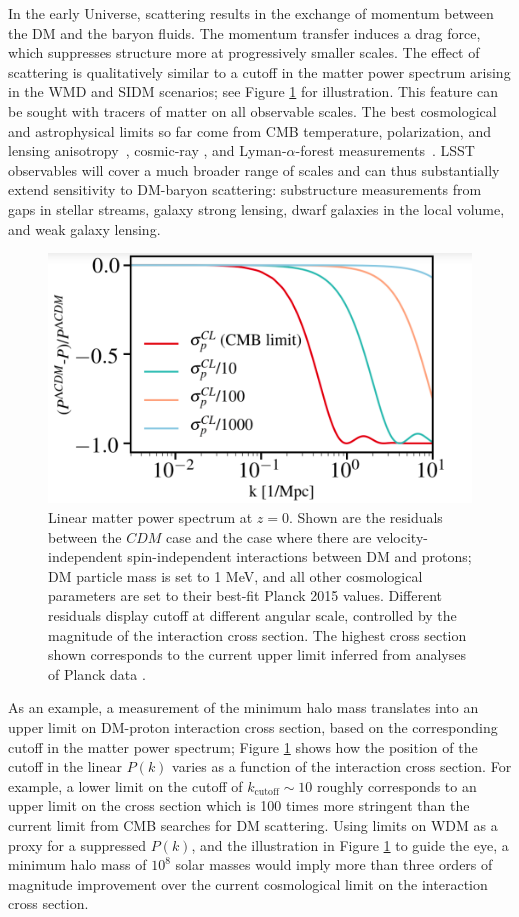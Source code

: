 In the early Universe, scattering results in the exchange of momentum between the DM and the baryon fluids.
The momentum transfer induces a drag force, which suppresses structure more at progressively smaller scales. 
The effect of scattering is qualitatively similar to a cutoff in the matter power spectrum arising in the WMD and SIDM scenarios; see Figure \ref{fig:dmbaryon_pk} for illustration.
This feature can be sought with tracers of matter on all observable scales. 
The best cosmological and astrophysical limits so far come from CMB temperature, polarization, and lensing anisotropy~\citep{Boddy:2018kfv,Gluscevic:2017ywp,Boddy:2018wzy,Xu:2018efh,Slatyer:2018aqg}, cosmic-ray \cite{}, and Lyman-$\alpha$-forest measurements~\citep{Dvorkin:2013cea,Xu:2018efh}. 
LSST observables will cover a much broader range of scales and can thus substantially extend sensitivity to DM-baryon scattering: substructure measurements from gaps in stellar streams, galaxy strong lensing, dwarf galaxies in the local volume, and weak galaxy lensing. 

\begin{figure}
\centering
\includegraphics[width=0.6\columnwidth]{figures/dmbaryon_pk.png}
\caption{Linear matter power spectrum at $z=0$. Shown are the residuals between the $CDM$ case and the case where there are velocity-independent spin-independent interactions between DM and protons; DM particle mass is set to 1 MeV, and all other cosmological parameters are set to their best-fit Planck 2015 values. Different residuals display cutoff at different angular scale, controlled by the magnitude of the interaction cross section. The highest cross section shown corresponds to the current upper limit inferred from analyses of Planck data \citep{Gluscevic:2017ywp,Boddy:2018kfv}.}
\label{fig:dmbaryon_pk}
\end{figure}
As an example, a measurement of the minimum halo mass translates into an upper limit on DM-proton interaction cross section, based on the corresponding cutoff in the  matter power spectrum; Figure \ref{fig:dmbaryon_pk} shows how the position of the cutoff in the linear $P(k)$ varies as a function of the interaction cross section. For example, a lower limit on the cutoff of $k_\text{cutoff}\sim 10$ roughly corresponds to an upper limit on the cross section which is 100 times more stringent than the current limit from CMB searches for DM scattering. Using limits on WDM as a proxy for a suppressed $P(k)$, and the illustration in Figure \ref{fig:dmbaryon_pk} to guide the eye, a minimum halo mass of $10^8$ solar masses would imply more than three orders of magnitude improvement over the current cosmological limit on the interaction cross section.

